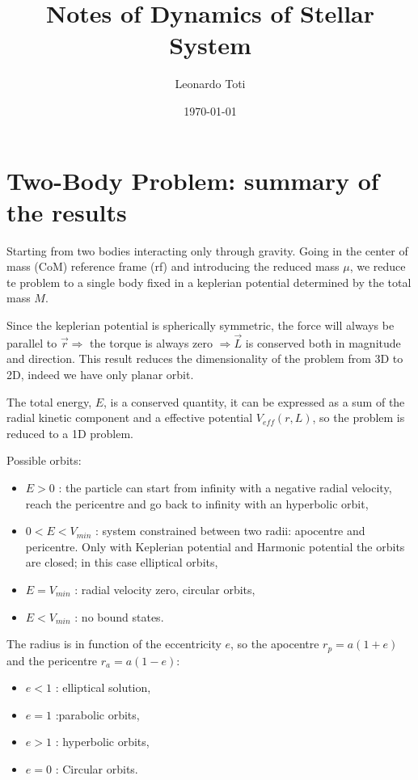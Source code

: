 \documentclass[a4paper,12pt]{article}
\title{Notes of Dynamics of Stellar System}
\author{Leonardo Toti}
\date{\today}
\begin{document}
\maketitle

\tableofcontents

\newpage

\section{Two-Body Problem: summary of the results}
Starting from two bodies interacting only through gravity.
Going in the center of mass (CoM) reference frame (rf) and introducing the reduced mass $\mu$, we reduce te problem to a single body fixed in a keplerian potential determined by the total mass $M$.

Since the keplerian potential is spherically symmetric, the force will always be parallel to $\vec{r} \Rightarrow $ the torque is always zero $\Rightarrow \vec{L}$ is conserved both in magnitude and direction. This result reduces the dimensionality of the problem from 3D to 2D, indeed we have only planar orbit.

The total energy, $E$, is a conserved quantity, it can be expressed as a sum of the radial kinetic component and a effective potential $V_{eff}(r,L)$, so the problem is reduced to a 1D problem. 

Possible orbits: 

\begin{itemize}
    \item $E>0$ : the particle can start from infinity with a negative radial velocity, reach the pericentre and go back to infinity with an hyperbolic orbit, 
    \item $0<E<V_{min}$ : system constrained between two radii: apocentre and pericentre. Only with Keplerian potential and Harmonic potential the orbits are closed; in this case elliptical orbits,
    \item $E=V_{min}$ : radial velocity zero, circular orbits,
    \item $E<V_{min}$ : no bound states.
\end{itemize}
	 

The radius is in function of the eccentricity $e$, so the apocentre $r_p = a(1+e)$ and the pericentre $r_a = a(1-e)$: 

\begin{itemize}
    \item $e<1$ :  elliptical solution,
    \item $e=1$ :parabolic orbits,
    \item $e>1$ : hyperbolic orbits, 
    \item $e=0$ : Circular orbits. 
\end{itemize}
\end{document}
